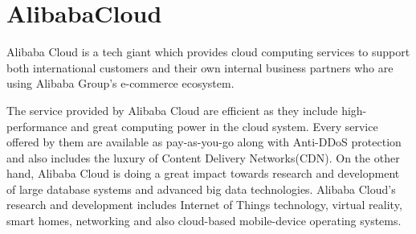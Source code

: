 \section{AlibabaCloud}

Alibaba Cloud is a tech giant which provides cloud computing services to support
both international customers and their own internal business partners who are
using Alibaba Group's e-commerce ecosystem.


The service provided by Alibaba Cloud are efficient as they include
high-performance and great computing power in the cloud system. Every service
offered by them are available as pay-as-you-go along with Anti-DDoS protection
and also includes the luxury of Content Delivery Networks(CDN). On the other
hand, Alibaba Cloud is doing a great impact towards research and development of
large database systems and advanced big data technologies. Alibaba Cloud's
research and development includes Internet of Things technology, virtual
reality, smart homes, networking and also cloud-based mobile-device
operating systems.~\cite{AlibabaCloud}

